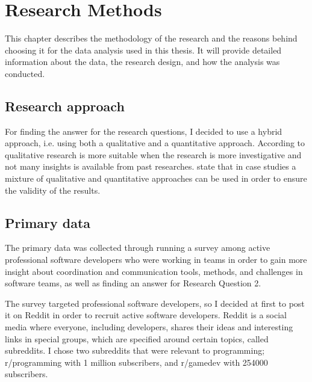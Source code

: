 \chapter{Research Methods}

This chapter describes the methodology of the research and the reasons behind choosing it for the data analysis used in this thesis. It will provide detailed information about the data, the research design, and how the analysis was conducted.

\section{Research approach}

For finding the answer for the research questions, I decided to use a hybrid approach, i.e. using both a qualitative and a quantitative approach. According to \citet{Ghauri2010} qualitative research is more suitable when the research is more investigative and not many insights is available from past researches. 
\citet{ Stray2012a} state that in case studies a mixture of qualitative and quantitative approaches can be used in order to ensure the validity of the results.  

\section{Primary data}

The primary data was collected through running a survey among active professional software developers who were working in teams in order to gain more insight about coordination and communication tools, methods, and challenges in software teams, as well as finding an answer for Research Question 2.

The survey targeted professional software developers, so I decided at first to post it on Reddit in order to recruit active software developers. Reddit is a social media where everyone, including developers, shares their ideas and interesting links in special groups, which are specified around certain topics, called subreddits. I chose two subreddits that were relevant to programming; r/programming with 1 million subscribers, and r/gamedev with 254000 subscribers.

